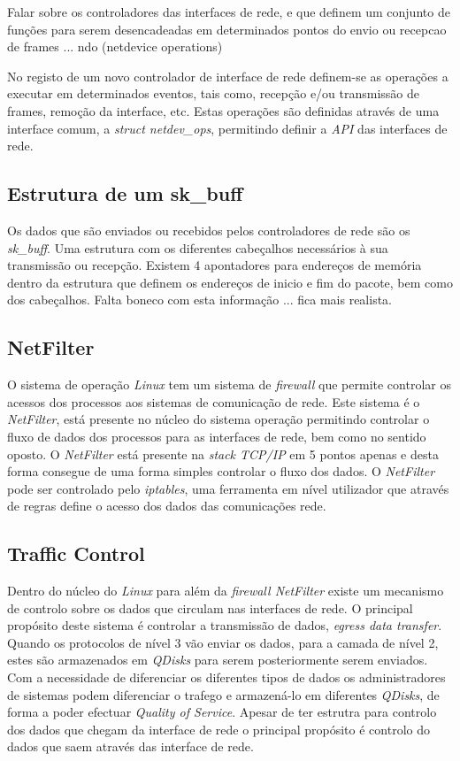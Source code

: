  Falar sobre os controladores das interfaces de rede, e que definem um conjunto de funções para serem desencadeadas em determinados pontos do envio ou recepcao de frames ... ndo (netdevice operations) 

 No registo de um novo controlador de interface de rede definem-se as operações a executar em determinados eventos, tais como, recepção e/ou transmissão de frames, remoção da interface, etc.
 Estas operações são definidas através de uma interface comum, a \textit{struct netdev\_ops}, permitindo definir a \textit{API} das interfaces de rede.
 
\subsection{Estrutura de um sk\_buff}
 Os dados que são enviados ou recebidos pelos controladores de rede são os \textit{sk\_buff}. Uma estrutura com os diferentes cabeçalhos necessários à sua transmissão ou recepção.
 Existem 4 apontadores para endereços de memória dentro da estrutura que definem os endereços de inicio e fim do pacote, bem como dos cabeçalhos.
 Falta boneco com esta informação ... fica mais realista.
 
%
%
\subsection{NetFilter}

O sistema de operação \textit{Linux} tem um sistema de \textit{firewall} que permite controlar os acessos dos processos aos sistemas de comunicação de rede.
 Este sistema é o \textit{NetFilter}, está presente no núcleo do sistema operação permitindo controlar o fluxo de dados dos processos para as interfaces de rede, bem como no sentido oposto.
 O \textit{NetFilter} está presente na \textit{stack TCP/IP} em 5 pontos apenas e desta forma consegue de uma forma simples controlar o fluxo dos dados.
 O \textit{NetFilter} pode ser controlado pelo \textit{iptables}, uma ferramenta em nível utilizador que através de regras define o acesso dos dados das comunicações rede.

\subsection{Traffic Control}
 Dentro do núcleo do \textit{Linux} para além da \textit{firewall NetFilter} existe um mecanismo de controlo sobre os dados que circulam nas interfaces de rede.
 O principal propósito deste sistema é controlar a transmissão de dados, \textit{egress data transfer}.
 Quando os protocolos de nível 3 vão enviar os dados, para a camada de nível 2, estes são armazenados em \textit{QDisks} para serem posteriormente serem enviados.
 Com a necessidade de diferenciar os diferentes tipos de dados os administradores de sistemas podem diferenciar o trafego e armazená-lo em diferentes \textit{QDisks}, de forma a poder efectuar \textit{Quality of Service}.
Apesar de ter estrutra para controlo dos dados que chegam da interface de rede o principal propósito é controlo do dados que saem através das interface de rede.

